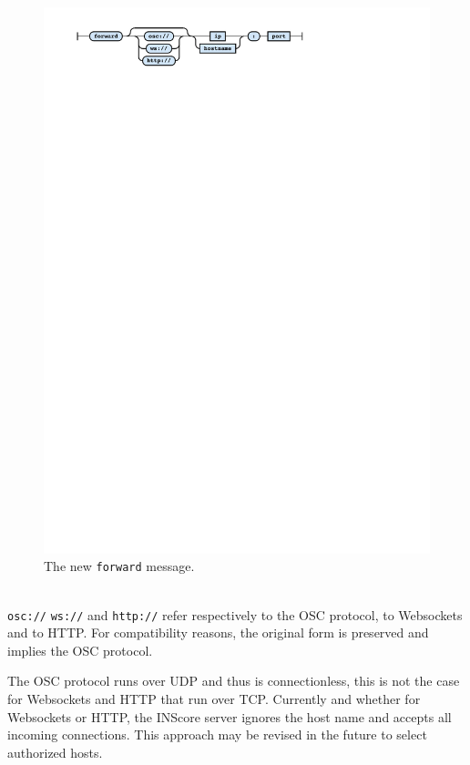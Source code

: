 \documentclass{article}
\newcommand{\icode}[1]	{{\small \texttt{#1}}}
\begin{document}
\begin{figure}[h]
\centering
\includegraphics[width=0.98\columnwidth]{rsrc/faust4.pdf}
\caption{The new \icode{forward} message.}
\label{fig:newforward}
\end{figure}\\
\icode{osc://} \icode{ws://} and \icode{http://} refer respectively to the OSC protocol, to Websockets and to HTTP.
For compatibility reasons, the original form is preserved and implies the OSC protocol.

The OSC protocol runs over UDP and thus is connectionless, this is not the case for Websockets and HTTP that run over TCP.
Currently and whether for Websockets or HTTP, the INScore server ignores the host name and accepts all incoming connections. This approach may be revised in the future to select authorized hosts.
\end{document}
